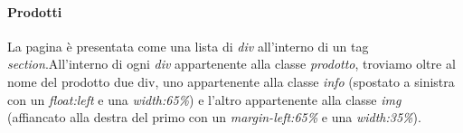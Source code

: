 \paragraph{Prodotti} \mbox{}
La pagina è presentata come una lista di \emph{div} all'interno di un tag \emph{section}.\newline All'interno di ogni \emph{div} appartenente alla classe \emph{prodotto}, troviamo oltre al nome del prodotto due div, uno appartenente alla classe \emph{info} (spostato a sinistra con un \emph{float:left} e una \emph{width:65\%}) e l'altro appartenente alla classe \emph{img} (affiancato alla destra del primo con un \emph{margin-left:65\%} e una \emph{width:35\%}). 